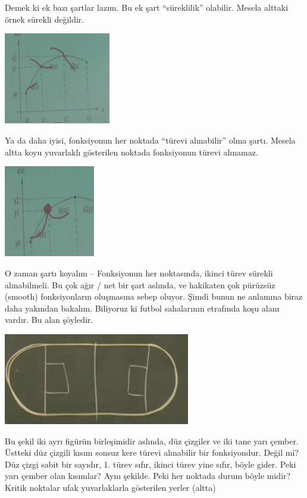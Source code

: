 \documentclass[12pt,fleqn]{article}\usepackage{../../common}
\begin{document}
Demek ki ek bazı şartlar lazım. Bu ek şart ``süreklilik'' olabilir. Mesela
alttaki örnek sürekli değildir.

\includegraphics[height=4cm]{spline5.png}

Ya da daha iyisi, fonksiyonun her noktada ``türevi alınabilir'' olma
şartı. Mesela altta koyu yuvarlaklı gösterilen noktada fonksiyonun türevi
alınamaz.

\includegraphics[height=4cm]{spline4.png}

O zaman şartı koyalım -- Fonksiyonun her noktasında, ikinci türev sürekli
alınabilmeli. Bu çok ağır / net bir şart aslında, ve hakikaten çok pürüzsüz
(smooth) fonksiyonların oluşmasına sebep oluyor. Şimdi bunun ne anlamına
biraz daha yakından bakalım. Biliyoruz ki futbol sahalarının etrafında koşu
alanı vardır. Bu alan şöyledir.

\includegraphics[height=4cm]{spline6.png}

Bu şekil iki ayrı figürün birleşimidir aslında, düz çizgiler ve iki tane
yarı çember. Üstteki düz çizgili kısım sonsuz kere türevi alınabilir bir
fonksiyondur. Değil mi? Düz çizgi sabit bir sayıdır, 1. türev sıfır, ikinci
türev yine sıfır, böyle gider. Peki yarı çember olan kısımlar? Aynı
şekilde. Peki her noktada durum böyle midir? Kritik noktalar ufak
yuvarlaklarla gösterilen yerler (altta)
\end{document}
